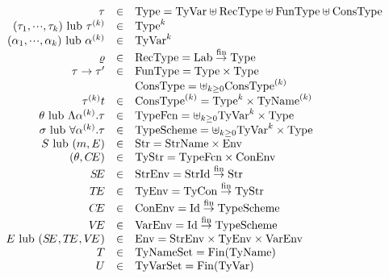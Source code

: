\begin{figure}
\begin{displaymath}
\begin{array}{rcl}
        \tau\index{\tau@{$\tau$ (type)}}        
&\in    &\Type\index{Type} = \TyVar\uplus\RecType\uplus\FunType
                                 \uplus\ConsType\\
 \longtauk\index{\tau k@{$\tauk$ (type vector)}}\ {\rm lub}\ \tauk
                & \in   & \Type^k\\
 \longalphak\ {\rm lub}\ \alphak
                & \in   & \TyVar^k\\
 \varrho\index{\varrho@{$\varrho$ (record type)}}
                & \in   & \RecType\index{RecType} = \finfun{\Lab}{\Type} \\
 \tau\rightarrow\tau'\index{\to@{$\tau\to\tau'$ (function type)}}
                & \in   & \FunType\index{FunType} = \Type\times\Type \\
                &       & \ConsType\index{ConsType} = \uplus_{k\geq 0}\ConsType^{(k)}\\
        \tauk\t & \in   & \ConsType^{(k)} = \Type^k\times\TyNamesk  \\
\typefcn\ {\rm lub}\ \typefcnk\index{\theta@{$\typefcn$ (type function)}}%
\index{\Lambda@{$\typefcnk$ (type function)}}
                & \in   & \TypeFcn\index{TypeFcn} = \uplus_{k\geq 0}\TyVar^k\times\Type\\
\tych\ {\rm lub}\ \longtych
                & \in   & \TypeScheme = \uplus_{k\geq 0}\TyVar^k\times\Type\\
\S\ {\rm lub}\ (\m,\E)
                & \in   & \Str = \StrNames\times\Env \\
(\theta,\CE)    & \in   & \TyStr = \TypeFcn\times\ConEnv\\
\SE             & \in   & \StrEnv = \finfun{\StrId}{\Str}\\
\TE             & \in   & \TyEnv = \finfun{\TyCon}{\TyStr}\\
\CE             & \in   & \ConEnv = \finfun{\Id}{\TypeScheme}\\
\VE             & \in   & \VarEnv =
\finfun{\Id}{\TypeScheme}\\
\E\ {\rm lub}\ \longE{}
                & \in   & \Env = \StrEnv\times\TyEnv\times\VarEnv\\
\T              & \in   & \TyNameSets = \Fin(\TyNames)\\
\U              & \in   & \TyVarSet = \Fin(\TyVar)\\

\end{array}
\end{displaymath}
\end{figure}
